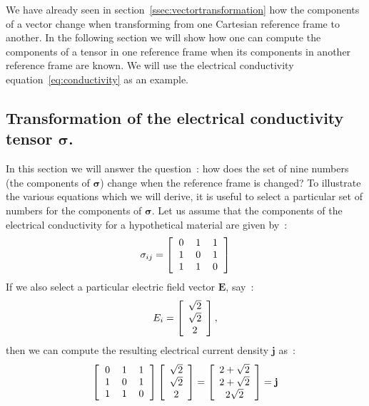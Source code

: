 We have already seen in section~\ref{ssec:vectortransformation} how the components of a vector change when transforming from one Cartesian reference frame to another. In the following section we will show how one can compute the components of a tensor in one reference frame when its components in another reference frame are known.  We will use the electrical conductivity equation~\ref{eq:conductivity} as an example.

\subsection{Transformation of the electrical conductivity tensor $\bm{\sigma}$.}
In this section we will answer the question~: how does the set of nine numbers (the components of $\bm{\sigma}$) change when the reference frame is changed?  To illustrate the various equations which we will derive, it is useful to select a particular set of numbers for the components of $\bm{\sigma}$.  Let us assume that the components of the electrical conductivity for a hypothetical material are given by~:
\[
\sigma_{ij}=\left[\begin{tabular}{ccc}\centering $0$ & $1$ & $1$ \\
$1$ & $0$ & $1$ \\
$1$ & $1$ & $0$ \\
\end{tabular}\right]
\]
If we also select a particular electric field vector $\mathbf{E}$, say~:
\[
E_i=\left[\begin{array}{c} \sqrt{2} \\ \sqrt{2} \\ 2 \end{array}\right],
\]
then we can compute the resulting electrical current density 
$\mathbf{j}$ as~:
\[
\left[\begin{tabular}{ccc}\centering $0$ & $1$ & $1$ \\
$1$ & $0$ & $1$ \\
$1$ & $1$ & $0$ \\
\end{tabular}\right] \columnthree{\sqrt{2}}{\sqrt{2}}{2}= 
\columnthree{2+\sqrt{2}}{2+\sqrt{2}}{2\sqrt{2}}=\mathbf{j}
\]

